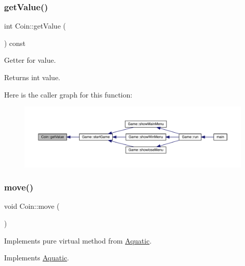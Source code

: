 \subsubsection{\texorpdfstring{get\+Value()}{getValue()}}
{\footnotesize\ttfamily int Coin\+::get\+Value (\begin{DoxyParamCaption}{ }\end{DoxyParamCaption}) const}



Getter for value. 

\begin{DoxyReturn}{Returns}
int value. 
\end{DoxyReturn}
Here is the caller graph for this function\+:
\nopagebreak
\begin{figure}[H]
\begin{center}
\leavevmode
\includegraphics[width=350pt]{class_coin_a53c8bf65afdde1422cfda51d753d74b7_icgraph}
\end{center}
\end{figure}
\mbox{\label{class_coin_ab62bca5834489b9b483deaa3ca3470e9}} 
\subsubsection{\texorpdfstring{move()}{move()}}
{\footnotesize\ttfamily void Coin\+::move (\begin{DoxyParamCaption}{ }\end{DoxyParamCaption})\hspace{0.3cm}{\ttfamily [virtual]}}



Implements pure virtual method from \mbox{\hyperlink{class_aquatic}{Aquatic}}. 



Implements \mbox{\hyperlink{class_aquatic_a962e93c804814eeaf3cea6e26698eef7}{Aquatic}}.

